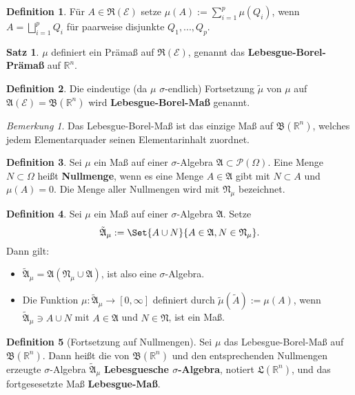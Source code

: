 \documentclass[a4paper,10pt,landscape]{article}
\newcommand{\R}{\mathbb{R}}
\newcommand{\PS}{\mathcal{P}} %
\newcommand{\PSO}{\PS(\Omega)} %
\newcommand{\Alg}{\mathfrak{A}}
\newcommand{\Ring}{\mathfrak{R}}
\theoremstyle{definition}
\newtheorem*{defn}{Definition}
\newtheorem*{satz}{Satz}
\theoremstyle{remark}
\newtheorem*{bem}{Bemerkung}
\renewcommand{\emph}[1]{\textcolor{Emph}{\bf{#1}}}
\begin{document}
\begin{multicols}{3}
\begin{defn}
  Für $A \in \Ring(\mathcal{E})$ setze $\mu(A) := \sum_{i = 1}^p \mu(Q_i)$, wenn $A = \bigsqcup_{i = 1}^p Q_i$ für paarweise disjunkte $Q_1, ..., Q_p$.
\end{defn}

\begin{satz}
  $\mu$ definiert ein Prämaß auf $\Ring(\mathcal{E})$, genannt das \emph{Lebesgue-Borel-Prämaß} auf $\R^n$.
\end{satz}

\begin{defn}
  Die eindeutige (da $\mu$ $\sigma$-endlich) Fortsetzung $\tilde{\mu}$ von $\mu$ auf $\Alg(\mathcal{E}) = \mathfrak{B}(\R^n)$ wird \emph{Lebesgue-Borel-Maß} genannt.
\end{defn}

\begin{bem}
  Das Lebesgue-Borel-Maß ist das einzige Maß auf $\mathfrak{B}(\R^n)$, welches jedem Elementarquader seinen Elementarinhalt zuordnet.
\end{bem}

\begin{defn}
  Sei $\mu$ ein Maß auf einer $\sigma$-Algebra $\Alg \subset \PSO$. Eine Menge $N \subset \Omega$ heißt \emph{Nullmenge}, wenn es eine Menge $A \in \Alg$ gibt mit $N \subset A$ und $\mu(A) = 0$. Die Menge aller Nullmengen wird mit $\mathfrak{N}_\mu$ bezeichnet.
\end{defn}

\begin{defn}
  Sei $\mu$ ein Maß auf einer $\sigma$-Algebra $\Alg$. Setze
  \[ \tilde{\Alg}_\mu := \Set{ A \cup N }{ A \in \Alg, N \in \mathfrak{N}_\mu }. \]
  Dann gilt:
  \begin{itemize}
    \item $\tilde{\Alg}_\mu = \Alg(\mathfrak{N}_\mu \cup \Alg)$, ist also eine $\sigma$-Algebra.
    \item Die Funktion $\mu : \tilde{\Alg}_\mu \to [0, \infty]$ definiert durch $\tilde\mu(\tilde{A}) := \mu(A)$, wenn $\tilde{\Alg}_\mu \ni A \cup N$ mit $A \in \Alg$ und $N \in \mathfrak{N}$, ist ein Maß.
  \end{itemize}
\end{defn}

\begin{defn}[Fortsetzung auf Nullmengen]
  Sei $\mu$ das Lebesgue-Borel-Maß auf $\mathfrak{B}(\R^n)$. Dann heißt die von $\mathfrak{B}(\R^n)$ und den entsprechenden Nullmengen erzeugte $\sigma$-Algebra $\tilde{\Alg}_\mu$ \emph{Lebesguesche $\sigma$-Algebra}, notiert $\mathfrak{L}(\R^n)$, und das fortgesesetzte Maß \emph{Lebesgue-Maß}.
\end{defn}


\end{multicols}
\end{document}
